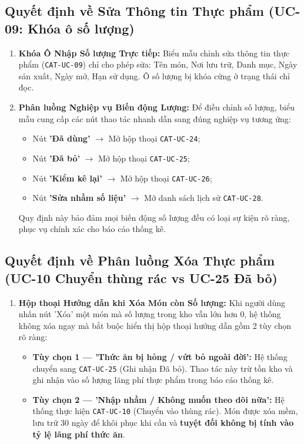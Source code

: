 \documentclass[10pt,a4paper]{article}
\begin{document}
\subsection{Quyết định về Sửa Thông tin Thực phẩm (UC-09: Khóa ô số lượng)}
\begin{enumerate}[itemsep=2pt]
    \item \textbf{Khóa Ô Nhập Số lượng Trực tiếp:} Biểu mẫu chỉnh sửa thông tin thực phẩm (\texttt{CAT-UC-09}) chỉ cho phép sửa: Tên món, Nơi lưu trữ, Danh mục, Ngày sản xuất, Ngày mở, Hạn sử dụng. Ô số lượng bị khóa cứng ở trạng thái chỉ đọc.
    \item \textbf{Phân luồng Nghiệp vụ Biến động Lượng:} Để điều chỉnh số lượng, biểu mẫu cung cấp các nút thao tác nhanh dẫn sang đúng nghiệp vụ tương ứng:
    \begin{itemize}
        \item Nút \textbf{'Đã dùng'} $\to$ Mở hộp thoại \texttt{CAT-UC-24};
        \item Nút \textbf{'Đã bỏ'} $\to$ Mở hộp thoại \texttt{CAT-UC-25};
        \item Nút \textbf{'Kiểm kê lại'} $\to$ Mở hộp thoại \texttt{CAT-UC-26};
        \item Nút \textbf{'Sửa nhầm số liệu'} $\to$ Mở danh sách lịch sử \texttt{CAT-UC-28}.
    \end{itemize}
    Quy định này bảo đảm mọi biến động số lượng đều có loại sự kiện rõ ràng, phục vụ chính xác cho báo cáo thống kê.
\end{enumerate}

\subsection{Quyết định về Phân luồng Xóa Thực phẩm (UC-10 Chuyển thùng rác vs UC-25 Đã bỏ)}
\begin{enumerate}[itemsep=2pt]
    \item \textbf{Hộp thoại Hướng dẫn khi Xóa Món còn Số lượng:} Khi người dùng nhấn nút 'Xóa' một món mà số lượng trong kho vẫn lớn hơn 0, hệ thống không xóa ngay mà bắt buộc hiển thị hộp thoại hướng dẫn gồm 2 tùy chọn rõ ràng:
    \begin{itemize}
        \item \textbf{Tùy chọn 1 --- 'Thức ăn bị hỏng / vứt bỏ ngoài đời':} Hệ thống chuyển sang \texttt{CAT-UC-25} (Ghi nhận Đã bỏ). Thao tác này trừ tồn kho và ghi nhận vào số lượng lãng phí thực phẩm trong báo cáo thống kê.
        \item \textbf{Tùy chọn 2 --- 'Nhập nhầm / Không muốn theo dõi nữa':} Hệ thống thực hiện \texttt{CAT-UC-10} (Chuyển vào thùng rác). Món được xóa mềm, lưu trữ 30 ngày để khôi phục khi cần và \textbf{tuyệt đối không bị tính vào tỷ lệ lãng phí thức ăn}.
    \end{itemize}
\end{enumerate}
\end{document}

